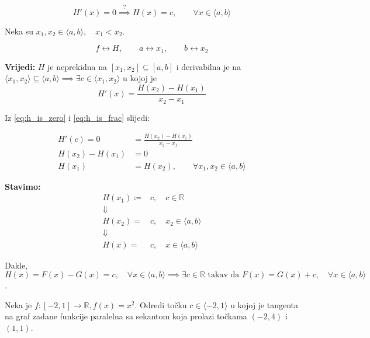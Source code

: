 \begin{multicols}{2}
$$
H'(x)=0\stackrel{?}{\implies}H(x)=c,\qquad\forall x\in \langle a,b \rangle
$$

Neka su $x_1,x_2 \in \langle a,b \rangle,\quad x_1<x_2$.

$$
f \leftrightarrow H,\qquad a\leftrightarrow x_1,\qquad b\leftrightarrow x_2
$$
\newcolumn

\noindent
\textbf{Vrijedi:} $H$ je neprekidna na $[x_1,x_2]\subseteq [a,b]$ i derivabilna
je na $\langle x_1,x_2 \rangle\subseteq\langle a,b \rangle \implies \exists c\in\langle x_1,x_2 \rangle$
u kojoj je
\begin{equation}
    \label{eq:h_is_frac}
    H'(x)=\frac{H(x_2)-H(x_1)}{x_2-x_1}\tag{B}
\end{equation}

Iz \ref{eq:h_is_zero} i \ref{eq:h_is_frac} slijedi:

\begin{align*}
H'(c) = 0 &= \frac{H(x_2)-H(x_1)}{x_2-x_1}\\
H(x_2)-H(x_1) &= 0\\
H(x_1) &= H(x_2),\qquad\forall x_1, x_2\in \langle a,b \rangle
\end{align*}

\noindent
\textbf{Stavimo:}
\begin{align*}
    H(x_1)\coloneq& c,\quad c\in\mathbb{R}\\
    \Downarrow&\\
    H(x_2)=&c,\quad x_2\in\langle a,b \rangle\\
    \Downarrow&\\
    H(x)=&c,\quad x\in\langle a,b \rangle
\end{align*}

\noindent
Dakle, $H(x) = F(x)-G(x)=c,\quad\forall x\in \langle a,b \rangle\implies\exists c\in\mathbb{R}\text{ takav da }F(x)=G(x)+c,\quad \forall x\in \langle a,b \rangle$.

\end{multicols}

\begin{example}
    Neka je $f:[-2,1] \to \mathbb{R}, f(x) = x^2$.
    Odredi točku $c\in\langle -2,1 \rangle$ u kojoj je tangenta na graf zadane
    funkcije paralelna sa sekantom koja prolazi točkama $(-2,4)$ i $(1,1)$.
\end{example}
